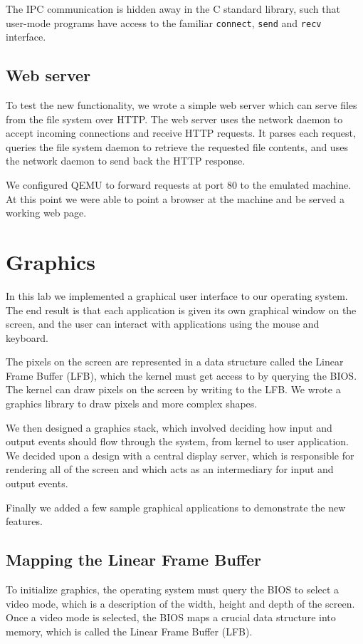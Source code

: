 \documentclass{report}
\begin{document}
The IPC communication is hidden away in the C standard library, such that
user-mode programs have access to the familiar \texttt{connect}, \texttt{send}
and \texttt{recv} interface.


\section{Web server}
To test the new functionality, we wrote a simple web server which can serve
files from the file system over HTTP. The web server uses the network daemon
to accept incoming connections and receive HTTP requests. It parses each
request, queries the file system daemon to retrieve the requested file
contents, and uses the network daemon to send back the HTTP response.

We configured QEMU to forward requests at port 80 to the emulated machine. At
this point we were able to point a browser at the machine and be served a
working web page.









\chapter{Graphics}
\label{sec:graphics}

In this lab we implemented a graphical user interface to our operating system.
The end result is that each application is given its own graphical window on
the screen, and the user can interact with applications using the mouse and
keyboard.

The pixels on the screen are represented in a data structure called the Linear
Frame Buffer (LFB), which the kernel must get access to by querying the BIOS.
The kernel can draw pixels on the screen by writing to the LFB. We wrote a
graphics library to draw pixels and more complex shapes.

We then designed a graphics stack, which involved deciding how input and
output events should flow through the system, from kernel to user application.
We decided upon a design with a central display server, which is responsible
for rendering all of the screen and which acts as an intermediary for input
and output events.

Finally we added a few sample graphical applications to demonstrate the new
features.


\section{Mapping the Linear Frame Buffer}
To initialize graphics, the operating system must query the BIOS to select a
video mode, which is a description of the width, height and depth of the
screen. Once a video mode is selected, the BIOS maps a crucial data structure
into memory, which is called the Linear Frame Buffer (LFB).
\end{document}
